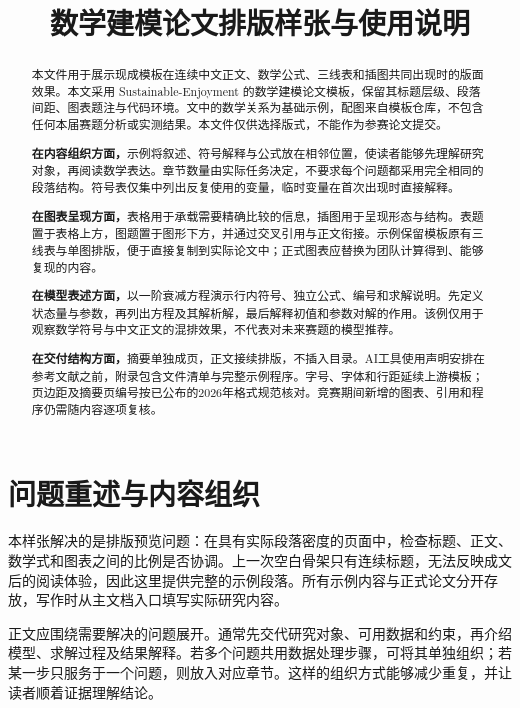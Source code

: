 \documentclass[withoutpreface,notoc,bwprint]{cumcmthesis}
\title{数学建模论文排版样张与使用说明}
\begin{document}
\maketitle
\thispagestyle{plain}
\begin{abstract}
本文件用于展示现成模板在连续中文正文、数学公式、三线表和插图共同出现时的版面效果。本文采用 Sustainable-Enjoyment 的数学建模论文模板，保留其标题层级、段落间距、图表题注与代码环境。文中的数学关系为基础示例，配图来自模板仓库，不包含任何本届赛题分析或实测结果。本文件仅供选择版式，不能作为参赛论文提交。

\textbf{在内容组织方面，}示例将叙述、符号解释与公式放在相邻位置，使读者能够先理解研究对象，再阅读数学表达。章节数量由实际任务决定，不要求每个问题都采用完全相同的段落结构。符号表仅集中列出反复使用的变量，临时变量在首次出现时直接解释。

\textbf{在图表呈现方面，}表格用于承载需要精确比较的信息，插图用于呈现形态与结构。表题置于表格上方，图题置于图形下方，并通过交叉引用与正文衔接。示例保留模板原有三线表与单图排版，便于直接复制到实际论文中；正式图表应替换为团队计算得到、能够复现的内容。

\textbf{在模型表述方面，}以一阶衰减方程演示行内符号、独立公式、编号和求解说明。先定义状态量与参数，再列出方程及其解析解，最后解释初值和参数对解的作用。该例仅用于观察数学符号与中文正文的混排效果，不代表对未来赛题的模型推荐。

\textbf{在交付结构方面，}摘要单独成页，正文接续排版，不插入目录。AI工具使用声明安排在参考文献之前，附录包含文件清单与完整示例程序。字号、字体和行距延续上游模板；页边距及摘要页编号按已公布的2026年格式规范核对。竞赛期间新增的图表、引用和程序仍需随内容逐项复核。

\end{abstract}

\section{问题重述与内容组织}
本样张解决的是排版预览问题：在具有实际段落密度的页面中，检查标题、正文、数学式和图表之间的比例是否协调。上一次空白骨架只有连续标题，无法反映成文后的阅读体验，因此这里提供完整的示例段落。所有示例内容与正式论文分开存放，写作时从主文档入口填写实际研究内容。

正文应围绕需要解决的问题展开。通常先交代研究对象、可用数据和约束，再介绍模型、求解过程及结果解释。若多个问题共用数据处理步骤，可将其单独组织；若某一步只服务于一个问题，则放入对应章节。这样的组织方式能够减少重复，并让读者顺着证据理解结论。
\end{document}
